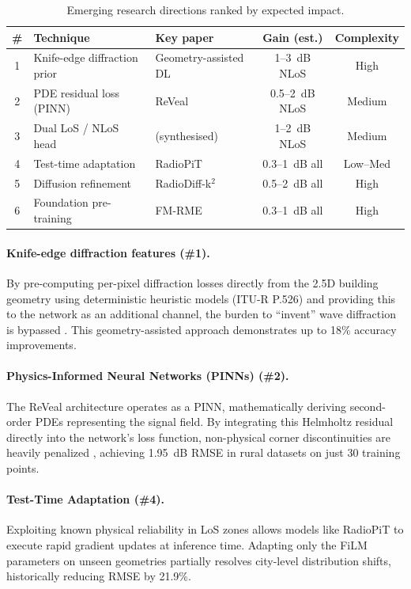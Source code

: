 \documentclass[11pt,a4paper]{article}
\begin{document}
\begin{table}[h!]
\centering
\caption{Emerging research directions ranked by expected impact.}
\label{tab:emerging}
\small
\begin{tabularx}{\textwidth}{clXcc}
\toprule
\textbf{\#} & \textbf{Technique} & \textbf{Key paper} & \textbf{Gain (est.)} & \textbf{Complexity} \\
\midrule
1 & Knife-edge diffraction prior & Geometry-assisted DL \cite{geomDL2024} & 1--3~dB NLoS & High \\
2 & PDE residual loss (PINN) & ReVeal \cite{reveal2025} & 0.5--2~dB NLoS & Medium \\
3 & Dual LoS / NLoS head & (synthesised) & 1--2~dB NLoS & Medium \\
4 & Test-time adaptation & RadioPiT \cite{radiopit2025} & 0.3--1~dB all & Low--Med \\
5 & Diffusion refinement & RadioDiff-k$^2$ \cite{radiodiff2025} & 0.5--2~dB all & High \\
6 & Foundation pre-training & FM-RME \cite{fmrme2026} & 0.3--1~dB all & High \\
\bottomrule
\end{tabularx}
\end{table}

\paragraph{Knife-edge diffraction features (\#1).}
By pre-computing per-pixel diffraction losses directly from the 2.5D building geometry using deterministic heuristic models (ITU-R P.526) and providing this to the network as an additional channel, the burden to ``invent'' wave diffraction is bypassed \cite{geomDL2024}. This geometry-assisted approach demonstrates up to 18\% accuracy improvements.

\paragraph{Physics-Informed Neural Networks (PINNs) (\#2).}
The ReVeal architecture operates as a PINN, mathematically deriving second-order PDEs representing the signal field. By integrating this Helmholtz residual directly into the network's loss function, non-physical corner discontinuities are heavily penalized \cite{reveal2025}, achieving 1.95~dB RMSE in rural datasets on just 30 training points.

\paragraph{Test-Time Adaptation (\#4).}
Exploiting known physical reliability in LoS zones allows models like RadioPiT \cite{radiopit2025} to execute rapid gradient updates at inference time. Adapting only the FiLM parameters on unseen geometries partially resolves city-level distribution shifts, historically reducing RMSE by 21.9\%.
\end{document}
